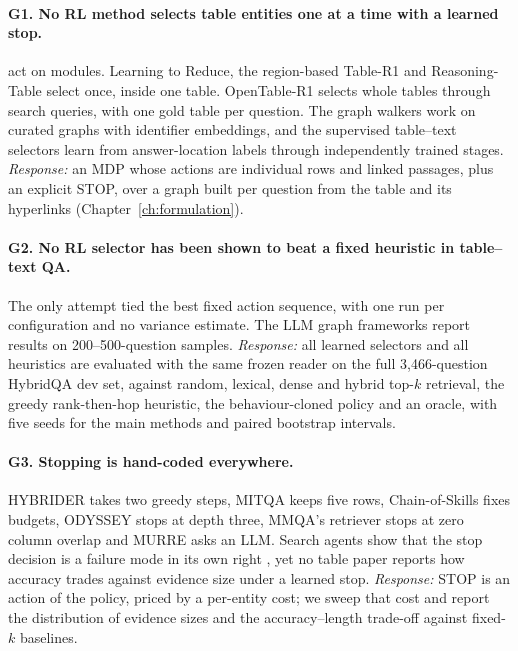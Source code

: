 \paragraph{G1. No RL method selects table entities one at a time with a learned stop.} \citet{jose2024qatexttablesdrl} act on modules. Learning to Reduce, the region-based Table-R1 and Reasoning-Table select once, inside one table. OpenTable-R1 selects whole tables through search queries, with one gold table per question. The graph walkers work on curated graphs with identifier embeddings, and the supervised table--text selectors learn from answer-location labels through independently trained stages. \emph{Response:} an MDP whose actions are individual rows and linked passages, plus an explicit STOP, over a graph built per question from the table and its hyperlinks (Chapter~\ref{ch:formulation}).

\paragraph{G2. No RL selector has been shown to beat a fixed heuristic in table--text QA.} The only attempt tied the best fixed action sequence, with one run per configuration and no variance estimate. The LLM graph frameworks report results on 200--500-question samples. \emph{Response:} all learned selectors and all heuristics are evaluated with the same frozen reader on the full 3{,}466-question HybridQA dev set, against random, lexical, dense and hybrid top-$k$ retrieval, the greedy rank-then-hop heuristic, the behaviour-cloned policy and an oracle, with five seeds for the main methods and paired bootstrap intervals.

\paragraph{G3. Stopping is hand-coded everywhere.} HYBRIDER takes two greedy steps, MITQA keeps five rows, Chain-of-Skills fixes budgets, ODYSSEY stops at depth three, MMQA's retriever stops at zero column overlap and MURRE asks an LLM. Search agents show that the stop decision is a failure mode in its own right \citep{wu2025searchwisely}, yet no table paper reports how accuracy trades against evidence size under a learned stop. \emph{Response:} STOP is an action of the policy, priced by a per-entity cost; we sweep that cost and report the distribution of evidence sizes and the accuracy--length trade-off against fixed-$k$ baselines.

